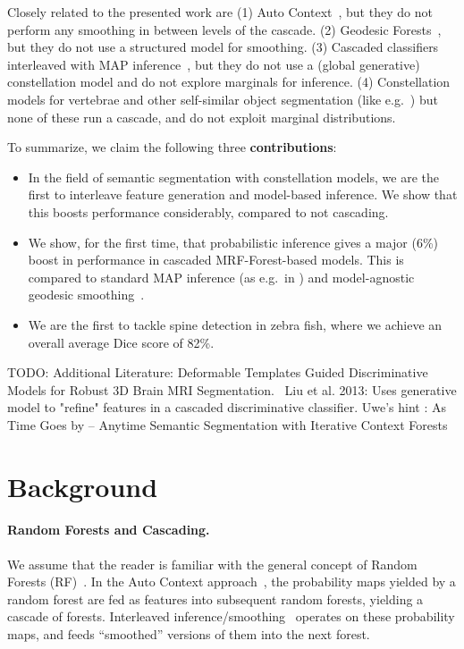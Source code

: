 \documentclass[10pt,twocolumn,letterpaper]{article}
\begin{document}
Closely related to the presented work are 
(1) Auto Context~\cite{AutoContext2008}, but they do not perform any smoothing in between levels of the cascade. 
(2) Geodesic Forests~\cite{GeoForests2013}, but they do not use a structured model for smoothing. 
(3) Cascaded classifiers interleaved with MAP inference~\cite{DTF,RTF,UweCVPR2013}, but they do not use a (global generative) constellation model and do not explore marginals for inference. 
(4) Constellation models for vertebrae and other self-similar object segmentation (like e.g.\ \cite{Glocker2012,Glocker2013,Klinder2009471,TeethMICCAI2012,WormMiccai2014}) but none of these run a cascade, and do not exploit marginal distributions. 

To summarize, we claim the following three {\bf contributions}:
\begin{itemize}
\item In the field of semantic segmentation with constellation models, we are the first to interleave feature generation and model-based inference. We show that this boosts performance considerably, compared to not cascading. 
\item We show, for the first time, that probabilistic inference gives a major (6\%) boost in performance in cascaded MRF-Forest-based models. This is compared to standard MAP inference (as e.g.\ in \cite{Glocker2013,SeifertAnatomicalSPIE2009,TeethMICCAI2012}) and model-agnostic geodesic smoothing~\cite{GeoForests2013,CriminisiAbdominalIPMI2011}. 
\item We are the first to tackle spine detection in zebra fish, where we achieve an overall average Dice score of 82\%.
\end{itemize}



%
TODO: Additional Literature: 
%
Deformable Templates Guided Discriminative Models for Robust 3D Brain MRI Segmentation.~\cite{BrainSeg2013}  Liu et al.  2013: Uses generative model to "refine" features in a cascaded discriminative classifier.
%
Uwe's hint \cite{Denzler2012}: As Time Goes by -- Anytime Semantic Segmentation with Iterative Context Forests

\section{Background}

\paragraph{Random Forests and Cascading. }
We assume that the reader is familiar with the general concept of Random Forests (RF)~\cite{BreimanRF}. 
%
In the Auto Context approach~\cite{AutoContext2008}, the probability maps yielded by a random forest are fed as features into subsequent random forests, yielding a cascade of forests.  
%
Interleaved inference/smoothing~\cite{DTF,RTF,UweCVPR2013,GeoForests2013} operates on these probability maps, and feeds ``smoothed'' versions of them into the next forest. 
%
\end{document}
